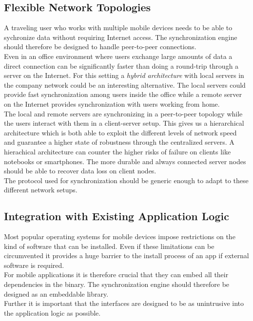 \subsection{Flexible Network Topologies}
\label{sec:main.requirements.topologies}
A traveling user who works with multiple mobile devices needs to be able to sychronize data without requiring Internet access.
The synchronization engine should therefore be designed to handle peer-to-peer connections.\\
Even in an office environment where users exchange large amounts of data a direct connection can be significantly faster than doing a round-trip through a server on the Internet.
For this setting a \emph{hybrid architecture} with local servers in the company network could be an interesting alternative.
The local servers could provide fast synchronization among users inside the office while a remote server on the Internet provides synchronization with users working from home.\\
The local and remote servers are synchronizing in a peer-to-peer topology while the users interact with them in a client-server setup.
This gives us a hierarchical architecture which is both able to exploit the different levels of network speed and guarantee a higher state of robustness through the centralized servers.
A hierachical architecture can counter the higher risks of failure on clients like notebooks or smartphones.
The more durable and always connected server nodes should be able to recover data loss on client nodes.\\
The protocol used for synchronization should be generic enough to adapt to these different network setups.

\subsection{Integration with Existing Application Logic}
Most popular operating systems for mobile devices impose restrictions on the kind of software that can be installed.
Even if these limitations can be circumvented it provides a huge barrier to the install process of an app if external software is required.\\
For mobile applications it is therefore crucial that they can embed all their dependencies in the binary.
The synchronization engine should therefore be designed as an embeddable library.\\
Further it is important that the interfaces are designed to be as unintrusive into the application logic as possible.\\

